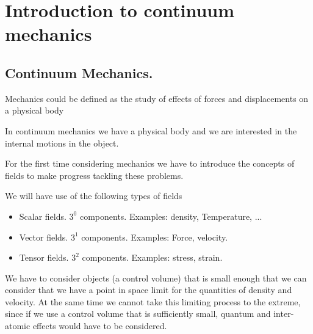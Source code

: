 % 
% 
% 
% 
% 
% 
% 
% 
% 
% 
% 
% 

\chapter{Introduction to continuum mechanics}
\section{Continuum Mechanics.}

Mechanics could be defined as the study of effects of forces and displacements on a physical body


In continuum mechanics we have a physical body and we are interested in the internal motions in the object.


For the first time considering mechanics we have to introduce the concepts of fields to make progress tackling these problems.

We will have use of the following types of fields

\begin{itemize}
\item Scalar fields.  $3^0$ components.  Examples: density, Temperature, ...
\item Vector fields.  $3^1$ components.  Examples: Force, velocity.
\item Tensor fields.  $3^2$ components.  Examples: stress, strain.
\end{itemize}

We have to consider objects (a control volume) that is small enough that we can consider that we have a point in space limit for the quantities of density and velocity.  At the same time we cannot take this limiting process to the extreme, since if we use a control volume that is sufficiently small, quantum and inter-atomic effects would have to be considered.

